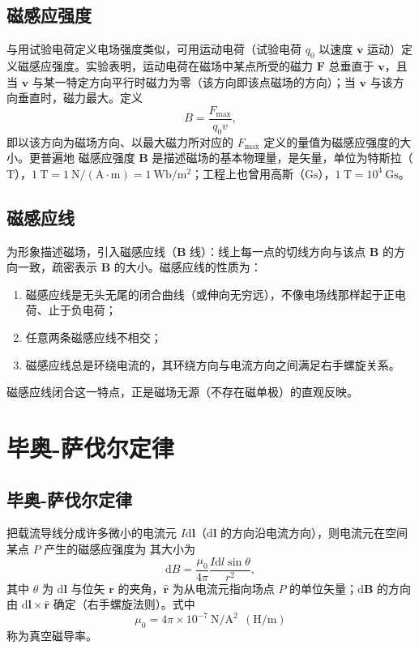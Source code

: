     \subsection{磁感应强度}
    与用试验电荷定义电场强度类似，可用运动电荷（试验电荷 $q_0$ 以速度 $\boldsymbol{v}$ 运动）定义磁感应强度。实验表明，运动电荷在磁场中某点所受的磁力 $\boldsymbol{F}$ 总垂直于 $\boldsymbol{v}$，且当 $\boldsymbol{v}$ 与某一特定方向平行时磁力为零（该方向即该点磁场的方向）；当 $\boldsymbol{v}$ 与该方向垂直时，磁力最大。定义
    \[
    B=\frac{F_{\max}}{q_0v},
    \]
    即以该方向为磁场方向、以最大磁力所对应的 $F_{\max}$ 定义的量值为磁感应强度的大小。更普遍地
    磁感应强度 $\boldsymbol{B}$ 是描述磁场的基本物理量，是矢量，单位为特斯拉（$\mathrm{T}$），$1\ \mathrm{T}=1\ \mathrm{N/(A\cdot m)}=1\ \mathrm{Wb/m^{2}}$；工程上也曾用高斯（$\mathrm{Gs}$），$1\ \mathrm{T}=10^{4}\ \mathrm{Gs}$。

    \subsection{磁感应线}
    为形象描述磁场，引入磁感应线（$\boldsymbol{B}$ 线）：线上每一点的切线方向与该点 $\boldsymbol{B}$ 的方向一致，疏密表示 $\boldsymbol{B}$ 的大小。磁感应线的性质为：
    \begin{enumerate}
        \item 磁感应线是无头无尾的闭合曲线（或伸向无穷远），不像电场线那样起于正电荷、止于负电荷；
        \item 任意两条磁感应线不相交；
        \item 磁感应线总是环绕电流的，其环绕方向与电流方向之间满足右手螺旋关系。
    \end{enumerate}
    磁感应线闭合这一特点，正是磁场无源（不存在磁单极）的直观反映。

\section{毕奥-萨伐尔定律}
    \subsection{毕奥-萨伐尔定律}
    把载流导线分成许多微小的电流元 $I\mathrm{d}\boldsymbol{l}$（$\mathrm{d}\boldsymbol{l}$ 的方向沿电流方向），则电流元在空间某点 $P$ 产生的磁感应强度为
    其大小为
    \[
    \mathrm{d}B=\frac{\mu_0}{4\pi}\frac{I\mathrm{d}l\sin\theta}{r^{2}},
    \]
    其中 $\theta$ 为 $\mathrm{d}\boldsymbol{l}$ 与位矢 $\boldsymbol{r}$ 的夹角，$\hat{\boldsymbol{r}}$ 为从电流元指向场点 $P$ 的单位矢量；$\mathrm{d}\boldsymbol{B}$ 的方向由 $\mathrm{d}\boldsymbol{l}\times\hat{\boldsymbol{r}}$ 确定（右手螺旋法则）。式中
    \[
    \mu_0=4\pi\times10^{-7}\ \mathrm{N/A^{2}}\ \ (\mathrm{H/m})
    \]
    称为真空磁导率。

